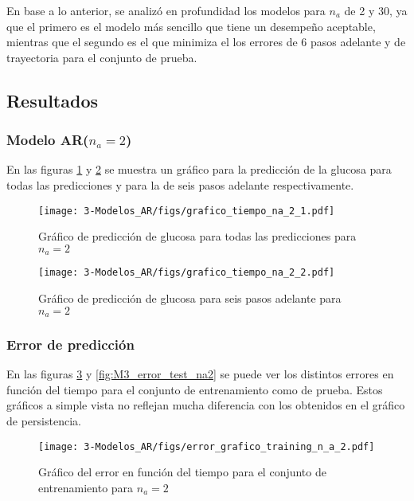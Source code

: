 En base a lo anterior, se analizó en profundidad los modelos para $n_a$ de 2 y 30, ya que el primero es el modelo más sencillo que tiene un desempeño aceptable, mientras que el segundo es el que minimiza el los errores de 6 pasos adelante y de trayectoria para el conjunto de prueba.

\subsection{Resultados}

\subsubsection{Modelo AR($n_a=2$)}

En las figuras \ref{fig:M3_tiempo_1} y \ref{fig:M3_tiempo_2} se muestra un gráfico para la predicción de la glucosa para todas las predicciones y para la de seis pasos adelante respectivamente.

\begin{figure}[H]
	\centering
	\texttt{[image: 3-Modelos\_AR/figs/grafico\_tiempo\_na\_2\_1.pdf]}
	\caption{Gráfico de predicción de glucosa para todas las predicciones para $n_a=2$}
	\label{fig:M3_tiempo_1}
\end{figure}

\begin{figure}[H]
	\centering
	\texttt{[image: 3-Modelos\_AR/figs/grafico\_tiempo\_na\_2\_2.pdf]}
	\caption{Gráfico de predicción de glucosa para seis pasos adelante para $n_a=2$}
	\label{fig:M3_tiempo_2}
\end{figure}


\subsubsection*{Error de predicción}

En las figuras \ref{fig:M3_error_train_na2} y \ref{fig:M3_error_test_na2} se puede ver los distintos errores en función del tiempo para el conjunto de entrenamiento como de prueba. Estos gráficos a simple vista no reflejan mucha diferencia con los obtenidos en el gráfico de persistencia.

\begin{figure}[H]
	\centering
	\texttt{[image: 3-Modelos\_AR/figs/error\_grafico\_training\_n\_a\_2.pdf]}
	\caption{Gráfico del error en función del tiempo para el conjunto de entrenamiento para $n_a=2$}
	\label{fig:M3_error_train_na2}
\end{figure}

